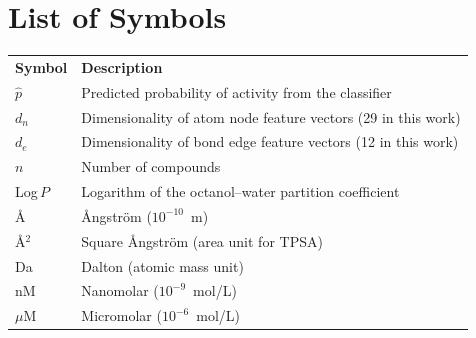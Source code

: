 
\chapter*{List of Symbols}
\thispagestyle{plain}

\begin{longtable}{@{}p{3.5cm}p{10cm}@{}}
\textbf{Symbol} & \textbf{Description} \\[0.3cm]

$\hat{p}$           & Predicted probability of activity
                      from the classifier \\
$d_n$               & Dimensionality of atom node feature
                      vectors (29 in this work) \\
$d_e$               & Dimensionality of bond edge feature
                      vectors (12 in this work) \\
$n$                 & Number of compounds \\
Log\,$P$            & Logarithm of the octanol--water
                      partition coefficient \\[0.2cm]

\AA                 & \r{A}ngstr\"{o}m ($10^{-10}$~m) \\
\AA$^2$             & Square \r{A}ngstr\"{o}m (area unit
                      for TPSA) \\
Da                  & Dalton (atomic mass unit) \\
nM                  & Nanomolar ($10^{-9}$~mol/L) \\
$\mu$M              & Micromolar ($10^{-6}$~mol/L) \\

\end{longtable}
